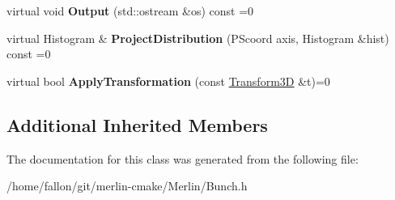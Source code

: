 \begin{DoxyCompactItemize}
\item 
\mbox{\label{classBunch_a6d87afade5729dcb2830a8c3fc3ee862}} 
virtual void {\bfseries Output} (std\+::ostream \&os) const =0
\item 
\mbox{\label{classBunch_acb5f121fce6c8334f37e79db78348c2a}} 
virtual Histogram \& {\bfseries Project\+Distribution} (P\+Scoord axis, Histogram \&hist) const =0
\item 
\mbox{\label{classBunch_af67bae6bc37a75e9a5ead6093b6eda96}} 
virtual bool {\bfseries Apply\+Transformation} (const \hyperlink{classTransform3D}{Transform3D} \&t)=0
\end{DoxyCompactItemize}
\subsection*{Additional Inherited Members}


The documentation for this class was generated from the following file\+:\begin{DoxyCompactItemize}
\item 
/home/fallon/git/merlin-\/cmake/\+Merlin/Bunch.\+h\end{DoxyCompactItemize}
